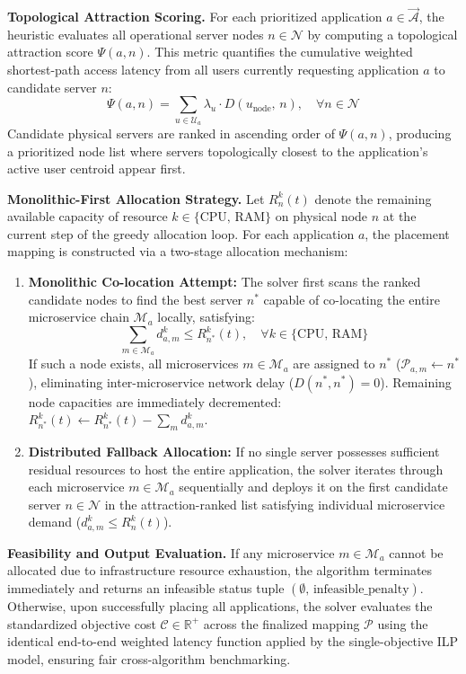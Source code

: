 \documentclass[ASNA]{USG} %
\begin{document}
\textbf{Topological Attraction Scoring.} For each prioritized application $a \in \vec{\mathcal{A}}$, the heuristic evaluates all operational server nodes $n \in \mathcal{N}$ by computing a topological attraction score $\Psi(a, n)$. This metric quantifies the cumulative weighted shortest-path access latency from all users currently requesting application $a$ to candidate server $n$:
\begin{equation}
\Psi(a, n) = \sum_{u \in \mathcal{U}_a} \lambda_u \cdot D(u_{\text{node}}, \, n), \quad \forall n \in \mathcal{N}
\end{equation}
Candidate physical servers are ranked in ascending order of $\Psi(a, n)$, producing a prioritized node list where servers topologically closest to the application's active user centroid appear first.

\textbf{Monolithic-First Allocation Strategy.} Let $R_n^k(t)$ denote the remaining available capacity of resource $k \in \{\text{CPU, RAM}\}$ on physical node $n$ at the current step of the greedy allocation loop. For each application $a$, the placement mapping is constructed via a two-stage allocation mechanism:
\begin{enumerate}
    \item \textbf{Monolithic Co-location Attempt:} The solver first scans the ranked candidate nodes to find the best server $n^*$ capable of co-locating the entire microservice chain $\mathcal{M}_a$ locally, satisfying:
    \begin{equation}
    \sum_{m \in \mathcal{M}_a} d_{a,m}^k \leq R_{n^*}^k(t), \quad \forall k \in \{\text{CPU, RAM}\}
    \end{equation}
    If such a node exists, all microservices $m \in \mathcal{M}_a$ are assigned to $n^*$ ($\mathcal{P}_{a,m} \leftarrow n^*$), eliminating inter-microservice network delay ($D(n^*, n^*) = 0$). Remaining node capacities are immediately decremented: $R_{n^*}^k(t) \leftarrow R_{n^*}^k(t) - \sum_m d_{a,m}^k$.
    \item \textbf{Distributed Fallback Allocation:} If no single server possesses sufficient residual resources to host the entire application, the solver iterates through each microservice $m \in \mathcal{M}_a$ sequentially and deploys it on the first candidate server $n \in \mathcal{N}$ in the attraction-ranked list satisfying individual microservice demand ($d_{a,m}^k \leq R_n^k(t)$).
\end{enumerate}

\textbf{Feasibility and Output Evaluation.} If any microservice $m \in \mathcal{M}_a$ cannot be allocated due to infrastructure resource exhaustion, the algorithm terminates immediately and returns an infeasible status tuple $(\emptyset, \, \text{infeasible\_penalty})$. Otherwise, upon successfully placing all applications, the solver evaluates the standardized objective cost $\mathcal{C} \in \mathbb{R}^+$ across the finalized mapping $\mathcal{P}$ using the identical end-to-end weighted latency function applied by the single-objective ILP model, ensuring fair cross-algorithm benchmarking.
\end{document}
